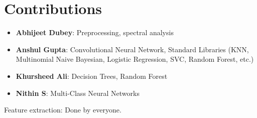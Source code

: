 \documentclass[a4paper,10pt]{article}
\begin{document}
\section{Contributions}
\begin{itemize}
\item \textbf{Abhijeet Dubey}: Preprocessing, spectral analysis
 \item \textbf{Anshul Gupta}: Convolutional Neural Network, Standard Libraries (KNN, Multinomial Naive Bayesian, Logistic Regression, SVC, Random Forest, etc.)
 \item \textbf{Khursheed Ali}: Decision Trees, Random Forest
 \item \textbf{Nithin S}: Multi-Class Neural Networks
 
\end{itemize}
Feature extraction: Done by everyone.



\end{document}
